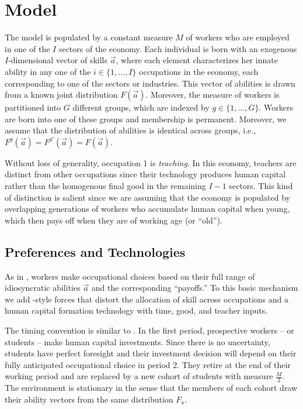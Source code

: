 \documentclass[onehalfspacing,11pt]{article}
\begin{document}
	\section{Model}\label{sec:model}
	The model is populated by a constant measure $M$ of workers who are employed in one of the $I$ sectors of the economy. Each individual is born with an exogenous $I$-dimensional vector of skills $\vec{a}$, where each element characterizes her innate ability in any one of the $i \in \{1,\ldots,I\}$ occupations in the economy, each corresponding to one of the sectors or industries. This vector of abilities is drawn from a known joint distribution $F(\vec{a})$. Moreover, the measure of workers is partitioned into $G$ different groups, which are indexed by $g \in \{1,\dots,G \}$. Workers are born into one of these groups and membership is permanent. Moreover, we assume that the distribution of abilities is identical across groups, i.e., $F^g(\vec{a}) = F^{g'}(\vec{a}) = F(\vec{a})$.
	
	Without loss of generality, occupation 1 is \textit{teaching}. In this economy, teachers are distinct from other occupations since their technology produces human capital rather than the homogenous final good in the remaining $I-1$ sectors. This kind of distinction is salient since we are assuming that the economy is populated by overlapping generations of workers who accumulate human capital when young, which then pays off when they are of working age (or ``old'').
	\subsection{Preferences and Technologies}\label{sec:workers}
	As in \cite{Roy:1951}, workers make occupational choices based on their full range of idiosyncratic abilities $\vec{a}$ and the corresponding ``payoffs.'' To this basic mechanism we add \cite{Hsieh:2019}-style forces that distort the allocation of skill across occupations and a human capital formation technology with time, good, and teacher inputs.
	
	The timing convention is similar to \cite{Hsieh:2019}. In the first period, prospective workers -- or students -- make human capital investments. Since there is no uncertainty, students have perfect foresight and their investment decision will depend on their fully anticipated occupational choice in period 2. They retire at the end of their working period and are replaced by a new cohort of students with measure $\tfrac{M}{2}$. The environment is stationary in the sense that the members of each cohort draw their ability vectors from the same distribution $F_a$.
	
\end{document}
